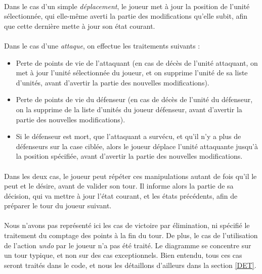 \documentclass[a4paper]{article}
\begin{document}
\paragraph{}
Dans le cas d'un simple \textit{déplacement}, le joueur met à jour la position de l'unité sélectionnée, qui elle-même averti la partie des modifications qu'elle subit, afin que cette dernière mette à jour son état courant.

\paragraph{}\label{fight_seq}
Dans le cas d'une \textit{attaque}, on effectue les traitements suivants :
\begin{itemize}
    \item Perte de points de vie de l'attaquant (en cas de décès de l'unité attaquant, on met à jour l'unité sélectionnée du joueur, et on supprime l'unité de sa liste d'unités, avant d'avertir la partie des nouvelles modifications).
    \item Perte de points de vie du défenseur (en cas de décès de l'unité du défenseur, on la supprime de la liste d'unités du joueur défenseur, avant d'avertir la partie des nouvelles modifications).
    \item Si le défenseur est mort, que l'attaquant a survécu, et qu'il n'y a plus de défenseurs sur la case ciblée, alors le joueur déplace l'unité attaquante jusqu'à la position spécifiée, avant d'avertir la partie des nouvelles modifications.
\end{itemize}

\paragraph{}
Dans les deux cas, le joueur peut répéter ces manipulations autant de fois qu'il le peut et le désire, avant de valider son tour. Il informe alors la partie de sa décision, qui va mettre à jour l'état courant, et les états précédents, afin de préparer le tour du joueur suivant.

\paragraph{}
Nous n'avons pas représenté ici les cas de victoire par élimination, ni spécifié le traitement du comptage des points à la fin du tour. De plus, le cas de l'utilisation de l'action \textit{undo} par le joueur n'a pas été traité. Le diagramme se concentre sur un tour typique, et non sur des cas exceptionnels. Bien entendu, tous ces cas seront traités dans le code, et nous les détaillons d'ailleurs dans la section \ref{DET}.
\end{document}

